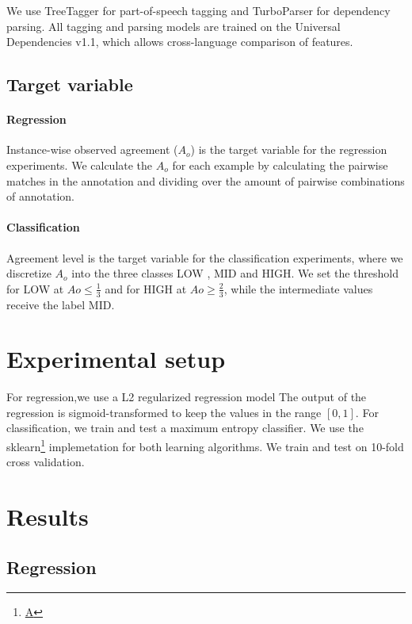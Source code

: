 \documentclass[11pt,a4paper]{article}
\begin{document}
We use TreeTagger for part-of-speech tagging and TurboParser for dependency parsing. All tagging and parsing models are trained on the Universal Dependencies v1.1, which allows cross-language comparison of features.

\subsection{Target variable}
\paragraph*{Regression} Instance-wise observed agreement ($A_o$) is the target variable for the regression experiments. We calculate  the $A_o$ for each example by calculating the pairwise matches in the annotation and dividing over the amount of pairwise combinations of annotation.
\paragraph*{Classification} Agreement level is the target variable for the classification experiments, where we discretize $A_o$ into the three classes LOW , MID and HIGH. We set the threshold for LOW at $Ao \le \frac{1}{3}$ and for HIGH at $Ao \ge \frac{2}{3}$, while the intermediate values receive the label MID.


\section{Experimental setup}
For regression,we use a L2 regularized regression model
The output of the regression is sigmoid-transformed to keep the values in the range $[0,1]$.
For classification, we train and test a maximum entropy classifier. We use the sklearn\footnote{\url{A}} implemetation for both learning algorithms. We train and test  on 10-fold cross validation.


\section{Results}
\subsection{Regression}
\end{document}
